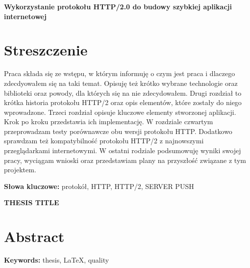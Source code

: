 \newpage
\begin{center}
\large \bf
Wykorzystanie protokołu HTTP/2.0 do budowy szybkiej aplikacji internetowej
\end{center}

\section*{Streszczenie}
Praca składa się ze wstępu, w którym informuję o czym jest praca i dlaczego zdecdyowałem się na taki temat.
Opisuję też krótko wybrane technologie oraz biblioteki oraz powody, dla których się na nie zdecydowałem.
Drugi rozdział to krótka historia protokołu HTTP/2 oraz opis elementów, które zostały do niego wprowadzone.
Trzeci rozdział opisuje kluczowe elementy stworzonej aplikacji.
Krok po kroku przedstawia ich implementację.
W rozdziale czwartym przeprowadzam testy porównawcze obu wersji protokołu HTTP.
Dodatkowo sprawdzam też kompatybilność protokołu HTTP/2 z najnowszymi przeglądarkami internetowymi.
W ostatni rodziale podsumowuję wyniki swojej pracy, wyciągam wnioski oraz przedstawiam plany na przyszłość związane z tym projektem.

\bigskip
{\noindent\bf Słowa kluczowe:} protokół, HTTP, HTTP/2, SERVER PUSH

\vskip 2cm


\begin{center}
\large \bf
THESIS TITLE
\end{center}

\section*{Abstract}

\bigskip
{\noindent\bf Keywords:} thesis, LaTeX, quality

\vfill